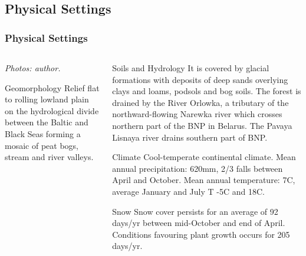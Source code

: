 \documentclass[pdflatex,compress,8pt,
	xcolor={dvipsnames,dvipsnames,svgnames,x11names,table},
	hyperref={colorlinks = true,
	breaklinks = true, urlcolor = NavyBlue, breaklinks = true}]{beamer}
\begin{document}
\subsection{Physical Settings}
\begin{frame}\frametitle{Physical Settings}
\begin{minipage}[0.4\textheight]{\textwidth}
\begin{columns}[T]
\begin{column}{0.5\textwidth}
\vspace{2em}
\begin{figure}[H]
	\centering
			\hspace{2mm}
			\vspace{2mm}
\end{figure}
\small{\emph{Photos: author.}}
\begin{alertblock}{Geomorphology}
Relief flat to rolling lowland plain on the hydrological divide between the Baltic and Black Seas forming a mosaic of peat bogs, stream and river valleys.
\end{alertblock}
\end{column}

\begin{column}{0.5\textwidth}
\vspace{4em} 

\begin{alertblock}{Soils and Hydrology}
 It is covered by glacial formations with deposits of deep sands overlying clays and loams, podsols and bog soils. The forest is drained by the River Orlowka, a tributary of the northward-flowing Narewka river which crosses northern part of the BNP in Belarus. The Pavaya Lisnaya river drains southern part of BNP. 
\end{alertblock}

\begin{block}{Climate}
Cool-temperate continental climate. Mean annual precipitation: 620mm, 2/3 falls between April and October.
Mean annual temperature: 7\degree C, average January and July T -5\degree C and 18\degree C. 
\end{block}

\begin{examples}{Snow}
Snow cover persists for an average of 92 days/yr between mid-October and end of April. Conditions favouring plant growth occurs for 205 days/yr.
\end{examples}
\end{column}
\end{columns}
\end{minipage}
\end{frame}
\end{document}
